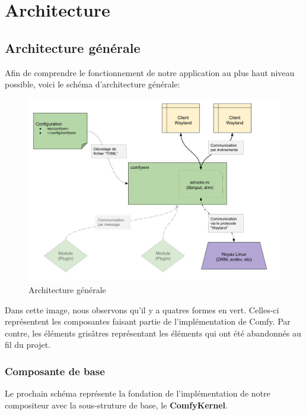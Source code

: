\documentclass[titlepage]{article}
\begin{document}
\section{Architecture}
\subsection{Architecture générale}
\par
Afin de comprendre le fonctionnement de notre application au plus haut niveau possible, voici le schéma d'architecture générale:
\bigskip

\begin{figure}[H]
	\centering
	\includegraphics[width=\textwidth]{architecture_generale_v1.jpg}
	\caption{Architecture générale}
\end{figure}

\par
Dans cette image, nous observons qu'il y a quatres formes en vert. Celles-ci représentent les composantes faisant partie de l'implémentation de Comfy. Par contre, les éléments grisâtres représentant les éléments qui ont été abandonnés au fil du projet.
\bigskip

\subsubsection{Composante de base}
\par
Le prochain schéma représente la fondation de l'implémentation de notre compositeur avec la sous-struture de base, le \textbf{ComfyKernel}.
\bigskip
\end{document}
